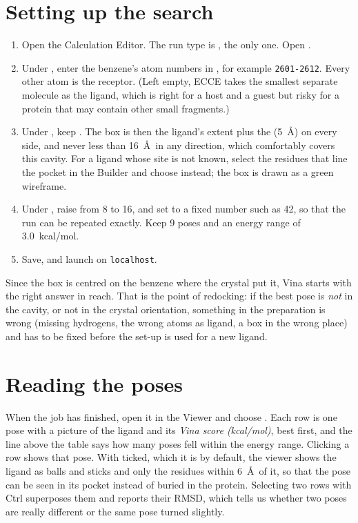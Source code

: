\section{Setting up the search}
\begin{enumerate}
	\item Open the Calculation Editor. The run type is , the only one. Open .
	\item Under , enter the benzene's atom numbers in , for example \texttt{2601-2612}. Every other atom is the receptor. (Left empty, ECCE takes the smallest separate molecule as the ligand, which is right for a host and a guest but risky for a protein that may contain other small fragments.)
	\item Under , keep . The box is then the ligand's extent plus the  (5~\AA) on every side, and never less than 16~\AA\ in any direction, which comfortably covers this cavity. For a ligand whose site is not known, select the residues that line the pocket in the Builder and choose  instead; the box is drawn as a green wireframe.
	\item Under , raise  from 8 to 16, and set  to a fixed number such as 42, so that the run can be repeated exactly. Keep 9 poses and an energy range of 3.0~kcal/mol.
	\item Save, and launch on \texttt{localhost}.
\end{enumerate}

Since the box is centred on the benzene where the crystal put it, Vina starts with the right answer in reach. That is the point of redocking: if the best pose is \emph{not} in the cavity, or not in the crystal orientation, something in the preparation is wrong (missing hydrogens, the wrong atoms as ligand, a box in the wrong place) and has to be fixed before the set-up is used for a new ligand.

\section{Reading the poses}
When the job has finished, open it in the Viewer and choose . Each row is one pose with a picture of the ligand and its \emph{Vina score (kcal/mol)}, best first, and the line above the table says how many poses fell within the energy range. Clicking a row shows that pose. With  ticked, which it is by default, the viewer shows the ligand as balls and sticks and only the residues within 6~\AA\ of it, so that the pose can be seen in its pocket instead of buried in the protein. Selecting two rows with Ctrl superposes them and reports their RMSD, which tells us whether two poses are really different or the same pose turned slightly.

